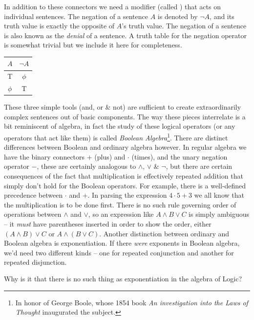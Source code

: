 In addition to these connectors we need a modifier (called 
) 
that acts on individual sentences.  The negation of a sentence $A$ is 
denoted by ${\lnot}A$, and its truth value is exactly the opposite of
$A$'s truth value.  The negation of a sentence is also known as the
\emph{denial} of a sentence. 
A truth table for the negation operator is somewhat 
trivial but we include it here for completeness.

\begin{center}
\begin{tabular}{c||c}
\; $A$ \; &  \; ${\lnot}A$ \; \\ \hline
 T & $\phi$ \\
 $\phi$ & T \\
\end{tabular}
\end{center}

These three simple tools (and, or \& not) are sufficient to 
create extraordinarily complex sentences out of basic components.
The way these pieces interrelate is a bit reminiscent of algebra,
in fact the study of these logical operators (or any
 operators that act like them) is called 
 {\em Boolean Algebra}\footnote{In honor of George Boole, whose 1854 %
 book {\em An investigation into the Laws of Thought} inaugurated the %
 subject.}.   There are distinct differences
between Boolean and ordinary algebra however.  In regular algebra we have
the binary connectors $+$ (plus) and $\cdot$ (times), and the unary 
negation operator $-$, these are certainly analogous to $\land$, $\lor$ \&
$\lnot$, but there are certain consequences of the fact that multiplication
is effectively repeated addition that simply don't hold for the Boolean
operators.  For example, there is a well-defined precedence between $\cdot$ and
$+$.   In parsing the expression $4 \cdot 5 + 3$ we all know that the 
multiplication is to be done first.  There is no such rule governing
order of operations between $\land$ and $\lor$, so an expression like
$A \land B \lor C$ is simply ambiguous -- it {\em must} have parentheses
inserted in order to show the order, either  $(A \land B) \lor C$ or 
$A \land (B \lor C)$.  Another distinction between ordinary and Boolean
algebra is exponentiation.  If there {\em were} exponents in Boolean algebra,
we'd need two different kinds -- one for repeated conjunction and another
for repeated disjunction. 

\begin{exer} 
Why is it that there is no such thing as exponentiation
in the algebra of Logic?
\end{exer}

